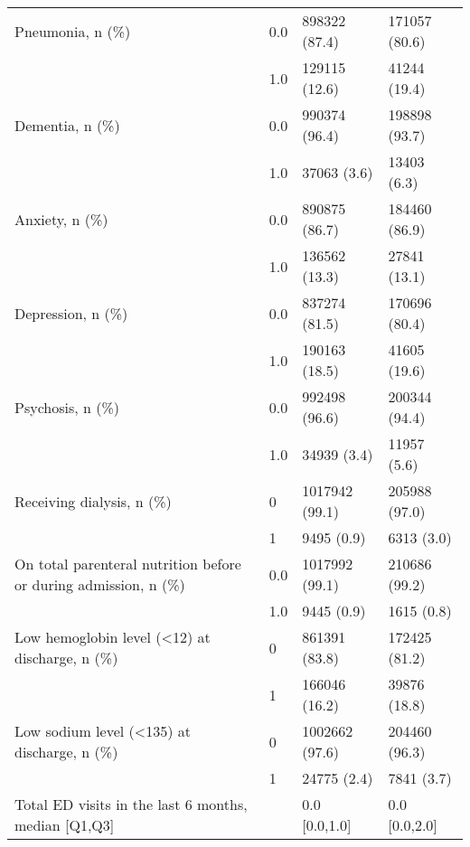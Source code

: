 \begin{tabular}{llll}
Pneumonia, n (\%) & 0.0 &                         898322 (87.4) &     171057 (80.6) \\
                                       & 1.0 &                         129115 (12.6) &      41244 (19.4) \\
Dementia, n (\%) & 0.0 &                         990374 (96.4) &     198898 (93.7) \\
                                       & 1.0 &                           37063 (3.6) &       13403 (6.3) \\
Anxiety, n (\%) & 0.0 &                         890875 (86.7) &     184460 (86.9) \\
                                       & 1.0 &                         136562 (13.3) &      27841 (13.1) \\
Depression, n (\%) & 0.0 &                         837274 (81.5) &     170696 (80.4) \\
                                       & 1.0 &                         190163 (18.5) &      41605 (19.6) \\
Psychosis, n (\%) & 0.0 &                         992498 (96.6) &     200344 (94.4) \\
                                       & 1.0 &                           34939 (3.4) &       11957 (5.6) \\
Receiving dialysis, n (\%) & 0 &                        1017942 (99.1) &     205988 (97.0) \\
                                       & 1 &                            9495 (0.9) &        6313 (3.0) \\
On total parenteral nutrition before or during admission, n (\%) & 0.0 &                        1017992 (99.1) &     210686 (99.2) \\
                                       & 1.0 &                            9445 (0.9) &        1615 (0.8) \\
Low hemoglobin level (<12) at discharge, n (\%) & 0 &                         861391 (83.8) &     172425 (81.2) \\
                                       & 1 &                         166046 (16.2) &      39876 (18.8) \\
Low sodium level (<135) at discharge, n (\%) & 0 &                        1002662 (97.6) &     204460 (96.3) \\
                                       & 1 &                           24775 (2.4) &        7841 (3.7) \\
Total ED visits in the last 6 months, median [Q1,Q3] &   &                         0.0 [0.0,1.0] &     0.0 [0.0,2.0] \\

\end{tabular}
